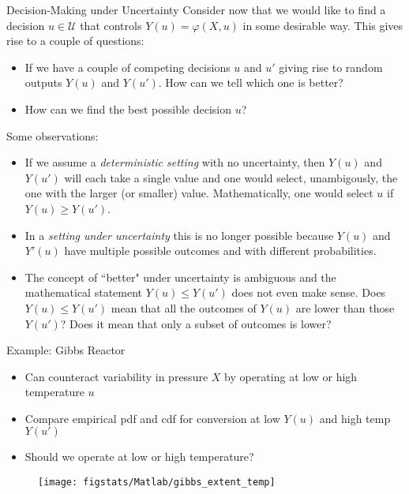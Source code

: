 \documentclass[9pt]{beamer}
\begin{document}
%
\begin{frame}{Decision-Making under Uncertainty}
Consider now that we would like to find a decision $u\in \mathcal{U}$ that controls $Y(u)=\varphi(X,u)$ in some desirable way. This gives rise to a couple of questions:
\begin{block}{}
\begin{itemize}
\item If we have a couple of competing decisions $u$ and $u'$ giving rise to random outputs $Y(u)$ and $Y(u')$. How can we tell which one is better? 

\item How can we find the best possible decision $u$?
\end{itemize}
\end{block}
Some observations: 
\begin{itemize}
\item If we assume a {\em deterministic setting} with no uncertainty, then $Y(u)$ and $Y(u')$ will each take a single value and one would select, unambigously,  the one with the larger (or smaller) value. Mathematically, one would select $u$ if $Y(u)\geq Y(u')$.   

\item In a {\em setting under uncertainty} this is no longer possible because $Y(u)$ and $Y'(u)$ have multiple possible outcomes and with different probabilities. 

\item The concept of ``better" under uncertainty is ambiguous and the mathematical statement $Y(u)\leq Y(u')$ does not even make sense. Does $Y(u)\leq Y(u')$ mean that all the outcomes of $Y(u)$ are lower than those $Y(u')$? Does it mean that only a subset of outcomes is lower? 
\end{itemize}

\end{frame}

\begin{frame}{Example: Gibbs Reactor}
\begin{itemize}
\item Can counteract variability in pressure $X$ by operating at low or high temperature $u$
\item Compare empirical pdf and cdf for conversion at low $Y(u)$ and high temp $Y(u')$
\item Should we operate at low or high temperature?
\end{itemize}
\begin{figure}[!htb]
    \centering
	\texttt{[image: figstats/Matlab/gibbs\_extent\_temp]}
\end{figure}

\end{frame}
\end{document}
